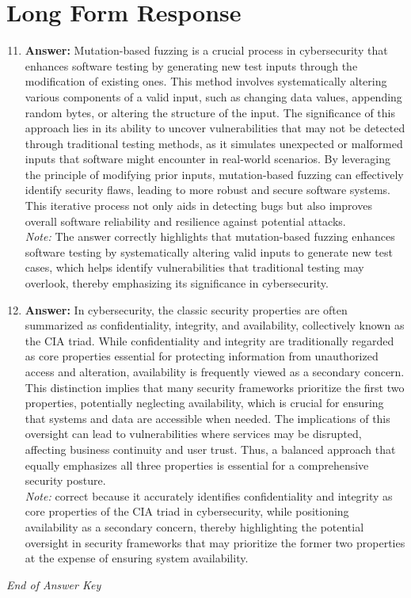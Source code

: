 \documentclass[12pt]{article}
\begin{document}
\section*{Long Form Response}
\begin{enumerate}[label=\arabic*.]
\setcounter{enumi}{10}
\item \textbf{Answer:} Mutation-based fuzzing is a crucial process in cybersecurity that enhances software testing by generating new test inputs through the modification of existing ones. This method involves systematically altering various components of a valid input, such as changing data values, appending random bytes, or altering the structure of the input. The significance of this approach lies in its ability to uncover vulnerabilities that may not be detected through traditional testing methods, as it simulates unexpected or malformed inputs that software might encounter in real-world scenarios. By leveraging the principle of modifying prior inputs, mutation-based fuzzing can effectively identify security flaws, leading to more robust and secure software systems. This iterative process not only aids in detecting bugs but also improves overall software reliability and resilience against potential attacks.
\\ \textit{Note:} The answer correctly highlights that mutation-based fuzzing enhances software testing by systematically altering valid inputs to generate new test cases, which helps identify vulnerabilities that traditional testing may overlook, thereby emphasizing its significance in cybersecurity.
\item \textbf{Answer:} In cybersecurity, the classic security properties are often summarized as confidentiality, integrity, and availability, collectively known as the CIA triad. While confidentiality and integrity are traditionally regarded as core properties essential for protecting information from unauthorized access and alteration, availability is frequently viewed as a secondary concern. This distinction implies that many security frameworks prioritize the first two properties, potentially neglecting availability, which is crucial for ensuring that systems and data are accessible when needed. The implications of this oversight can lead to vulnerabilities where services may be disrupted, affecting business continuity and user trust. Thus, a balanced approach that equally emphasizes all three properties is essential for a comprehensive security posture.
\\ \textit{Note:} correct because it accurately identifies confidentiality and integrity as core properties of the CIA triad in cybersecurity, while positioning availability as a secondary concern, thereby highlighting the potential oversight in security frameworks that may prioritize the former two properties at the expense of ensuring system availability.
\end{enumerate}

\vfill
\noindent\textit{End of Answer Key}
\end{document}
